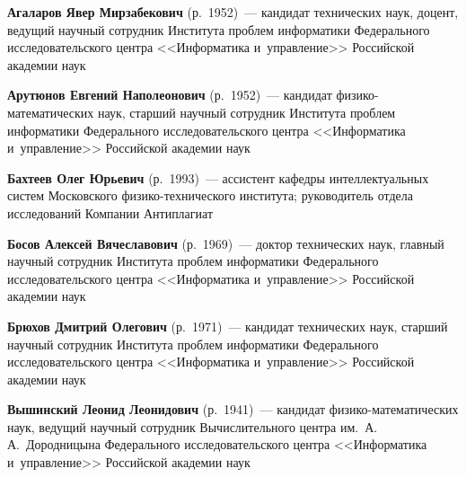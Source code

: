 \begin{multicols}{2}

\smallskip  





\noindent
  \textbf{Агаларов Явер Мирзабекович} (р.\ 1952)~--- 
  кандидат технических наук, доцент, ведущий научный сотрудник Института проб\-лем 
  информатики Федерального исследовательского центра <<Информатика и~управ\-ле\-ние>>
   Российской академии наук
   
   \vspace*{3pt}
   
\noindent
\textbf{Арутюнов Евгений Наполеонович} (р.\ 1952)~--- кандидат 
фи\-зи\-ко-ма\-те\-ма\-ти\-че\-ских наук, старший научный сотрудник Института проб\-лем 
информатики Федерального исследовательского цент\-ра <<Информатика и~управ\-ле\-ние>> Российской академии наук

   \vspace*{3pt}

\noindent
\textbf{Бахтеев Олег Юрьевич} (р.\ 1993)~--- 
ассистент кафедры интеллектуальных сис\-тем Московского фи\-зи\-ко-тех\-ни\-че\-ско\-го института; 
руководитель отдела исследований Компании Антиплагиат

   \vspace*{3pt}

\noindent
\textbf{Босов Алексей Вячеславович} (р.\ 1969)~--- 
доктор технических наук, главный научный сотрудник Института проб\-лем 
информатики Федерального исследовательского центра <<Информатика и~управ\-ле\-ние>>
Российской академии наук

   \vspace*{3pt}
   
   \noindent
  \textbf{Брюхов Дмитрий Олегович} (р.\ 1971)~--- 
  кандидат технических наук, старший научный сотрудник Института проб\-лем 
  информатики Федерального иссле\-до\-ва\-тель\-ско\-го цент\-ра <<Информатика и~управ\-ле\-ние>> 
  Российской академии наук
   
      \vspace*{3pt}
      
   \noindent
\textbf{Вышинский Леонид Леонидович} (р.\ 1941)~--- кандидат 
фи\-зи\-ко-ма\-те\-ма\-ти\-че\-ских наук, ведущий научный сотрудник 
Вычислительного цент\-ра им.\ А.\,А.~Дородницына Федерального исследовательского цент\-ра 
<<Информатика и~управ\-ле\-ние>> Российской академии наук 

   \vspace*{3pt}
   

\end{multicols}
